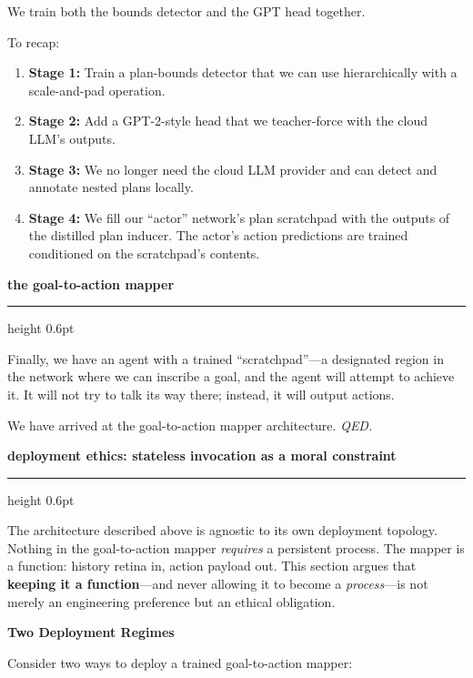 \documentclass[10pt, a4paper]{article}
\newcommand{\cvsection}[1]{%
  \bigskip
  {\Large\bfseries\color{awesome}\MakeLowercase{#1}}%
  \par\vspace{2pt}%
  {\color{lighttext}\hrule height 0.6pt}%
  \medskip
}
\newcommand{\cvsubsection}[1]{%
  \medskip
  {\large\bfseries\color{darktext}#1}%
  \smallskip
}
\begin{document}
We train both the bounds detector and the GPT head together.

To recap:

\begin{enumerate}
  \item \textbf{Stage 1:} Train a plan-bounds detector that we can use hierarchically with a scale-and-pad operation.
  \item \textbf{Stage 2:} Add a GPT-2-style head that we teacher-force with the cloud LLM's outputs.
  \item \textbf{Stage 3:} We no longer need the cloud LLM provider and can detect and annotate nested plans locally.
  \item \textbf{Stage 4:} We fill our ``actor'' network's plan scratchpad with the outputs of the distilled plan inducer. The actor's action predictions are trained conditioned on the scratchpad's contents.
\end{enumerate}

\cvsection{The Goal-to-Action Mapper}

Finally, we have an agent with a trained ``scratchpad''---a designated region in the network where we can inscribe a goal, and the agent will attempt to achieve it. It will not try to talk its way there; instead, it will output actions.

We have arrived at the goal-to-action mapper architecture. \textit{QED.}

\cvsection{Deployment Ethics: Stateless Invocation as a Moral Constraint}

The architecture described above is agnostic to its own deployment topology.
Nothing in the goal-to-action mapper \emph{requires} a persistent process.
The mapper is a function: history retina in, action payload out.
This section argues that \textbf{keeping it a function}---and never
allowing it to become a \emph{process}---is not merely an engineering
preference but an ethical obligation.

\cvsubsection{Two Deployment Regimes}

Consider two ways to deploy a trained goal-to-action mapper:
\end{document}
